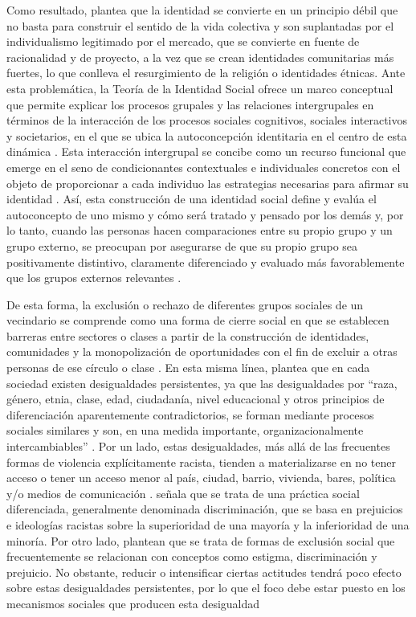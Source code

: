 \documentclass[12pt,twoside]{templates/facsothesis}
\begin{document}
Como resultado, \citet{castells_globalizacion_2005} plantea que la identidad se convierte en un principio débil que no basta para construir el sentido de la vida colectiva y son suplantadas por el individualismo legitimado por el mercado, que se convierte en fuente de racionalidad y de proyecto, a la vez que se crean identidades comunitarias más fuertes, lo que conlleva el resurgimiento de la religión o identidades étnicas. Ante esta problemática, la Teoría de la Identidad Social ofrece un marco conceptual que permite explicar los procesos grupales y las relaciones intergrupales en términos de la interacción de los procesos sociales cognitivos, sociales interactivos y societarios, en el que se ubica la autoconcepción identitaria en el centro de esta dinámica \citep{hogg_social_2016}. Esta interacción intergrupal se concibe como un recurso funcional que emerge en el seno de condicionantes contextuales e individuales concretos con el objeto de proporcionar a cada individuo las estrategias necesarias para afirmar su identidad \citep{scandroglio_teoria_2008}. Así, esta construcción de una identidad social define y evalúa el autoconcepto de uno mismo y cómo será tratado y pensado por los demás y, por lo tanto, cuando las personas hacen comparaciones entre su propio grupo y un grupo externo, se preocupan por asegurarse de que su propio grupo sea positivamente distintivo, claramente diferenciado y evaluado más favorablemente que los grupos externos relevantes \citep{hogg_social_2016}.

De esta forma, la exclusión o rechazo de diferentes grupos sociales de un vecindario se comprende como una forma de cierre social en que se establecen barreras entre sectores o clases a partir de la construcción de identidades, comunidades y la monopolización de oportunidades con el fin de excluir a otras personas de ese círculo o clase \citep{parkin_Marxismo_1984}. En esta misma línea, \citet{tilly_desigualdad_2000} plantea que en cada sociedad existen desigualdades persistentes, ya que las desigualdades por ``raza, género, etnia, clase, edad, ciudadanía, nivel educacional y otros principios de diferenciación aparentemente contradictorios, se forman mediante procesos sociales similares y son, en una medida importante, organizacionalmente intercambiables'' \citep[p.~23]{tilly_desigualdad_2000}. Por un lado, estas desigualdades, más allá de las frecuentes formas de violencia explícitamente racista, tienden a materializarse en no tener acceso o tener un acceso menor al país, ciudad, barrio, vivienda, bares, política y/o medios de comunicación \citep{vandijk_Racismo_2013}. \citet{vandijk_Racismo_2013} señala que se trata de una práctica social diferenciada, generalmente denominada discriminación, que se basa en prejuicios e ideologías racistas sobre la superioridad de una mayoría y la inferioridad de una minoría. Por otro lado, \citet{diez-nicolas_Exclusion_2019} plantean que se trata de formas de exclusión social que frecuentemente se relacionan con conceptos como estigma, discriminación y prejuicio. No obstante, reducir o intensificar ciertas actitudes tendrá poco efecto sobre estas desigualdades persistentes, por lo que el foco debe estar puesto en los mecanismos sociales que producen esta desigualdad \citep{tilly_desigualdad_2000}
\end{document}
